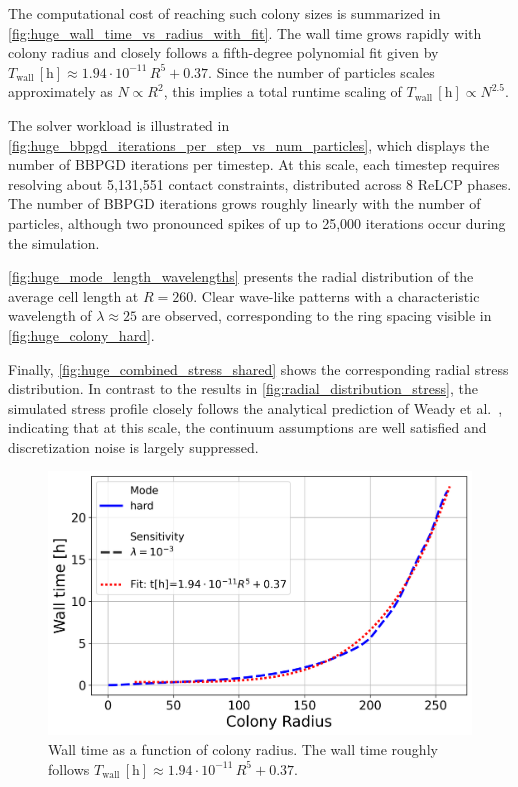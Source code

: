 \documentclass[conference]{IEEEtran}
\begin{document}
The computational cost of reaching such colony sizes is summarized in \autoref{fig:huge_wall_time_vs_radius_with_fit}. The wall time grows rapidly with colony radius and closely follows a fifth-degree polynomial fit given by $T_\text{wall}\,[\mathrm{h}] \approx 1.94\cdot10^{-11}\,R^{5} + 0.37$. Since the number of particles scales approximately as $N \propto R^{2}$, this implies a total runtime scaling of $T_\text{wall}\,[\mathrm{h}] \propto N^{2.5}$.

The solver workload is illustrated in \autoref{fig:huge_bbpgd_iterations_per_step_vs_num_particles}, which displays the number of BBPGD iterations per timestep. At this scale, each timestep requires resolving about 5{,}131{,}551 contact constraints, distributed across 8 ReLCP phases. The number of BBPGD iterations grows roughly linearly with the number of particles, although two pronounced spikes of up to 25{,}000 iterations occur during the simulation.

\autoref{fig:huge_mode_length_wavelengths} presents the radial distribution of the average cell length at $R = 260$. Clear wave-like patterns with a characteristic wavelength of $\lambda \approx 25$ are observed, corresponding to the ring spacing visible in \autoref{fig:huge_colony_hard}.

Finally, \autoref{fig:huge_combined_stress_shared} shows the corresponding radial stress distribution. In contrast to the results in \autoref{fig:radial_distribution_stress}, the simulated stress profile closely follows the analytical prediction of Weady et al.~\cite{Weady2024SM}, indicating that at this scale, the continuum assumptions are well satisfied and discretization noise is largely suppressed.

\begin{figure}[h]
    \centering
    \includegraphics[width=\linewidth]{figures/huge/huge_wall_time_vs_radius_with_fit.png}
    \caption{Wall time as a function of colony radius. The wall time roughly follows $T_\text{wall}\,[\mathrm{h}] \approx 1.94\cdot10^{-11}\,R^{5} + 0.37$.}
    \label{fig:huge_wall_time_vs_radius_with_fit}
\end{figure}
\end{document}
